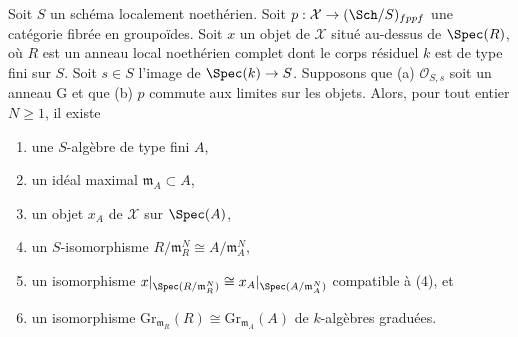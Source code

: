 \begin{lemma}
\label{lemma-approximate}
Soit $S$ un schéma localement noethérien. Soit
$p : \mathcal{X} \to (\Sch/S)_{fppf}$ une catégorie fibrée en groupoïdes.
Soit $x$ un objet de $\mathcal{X}$ situé au-dessus de $\Spec(R)$, où $R$ est
un anneau local noethérien complet dont le corps résiduel $k$ est de type fini
sur $S$. Soit $s \in S$ l'image de $\Spec(k) \to S$. Supposons que
(a) $\mathcal{O}_{S, s}$ soit un anneau G et que (b) $p$ commute aux limites
sur les objets. Alors, pour tout entier $N \geq 1$, il existe
\begin{enumerate}
\item une $S$-algèbre de type fini $A$,
\item un idéal maximal $\mathfrak m_A \subset A$,
\item un objet $x_A$ de $\mathcal{X}$ sur $\Spec(A)$,
\item un $S$-isomorphisme $R/\mathfrak m_R^N \cong A/\mathfrak m_A^N$,
\item un isomorphisme
$x|_{\Spec(R/\mathfrak m_R^N)} \cong x_A|_{\Spec(A/\mathfrak m_A^N)}$
compatible à (4), et
\item un isomorphisme
$\text{Gr}_{\mathfrak m_R}(R) \cong \text{Gr}_{\mathfrak m_A}(A)$
de $k$-algèbres graduées.
\end{enumerate}
\end{lemma}

